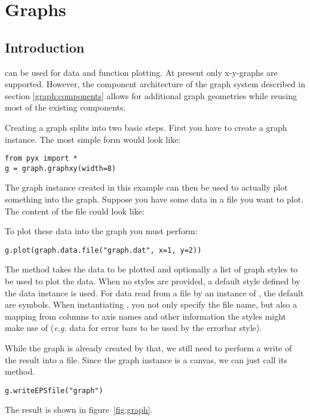 \chapter{Graphs}
\label{graph}
\let\e=\textbackslash

\section{Introduction} %
\PyX{} can be used for data and function plotting. At present only
x-y-graphs are supported. However, the component architecture of the
graph system described in section \ref{graph:components} allows for
additional graph geometries while reusing most of the existing
components.

Creating a graph splits into two basic steps. First you have to create
a graph instance. The most simple form would look like:
\begin{verbatim}
from pyx import *
g = graph.graphxy(width=8)
\end{verbatim}
The graph instance  created in this example can then be used
to actually plot something into the graph. Suppose you have some data
in a file  you want to plot. The content of the file
could look like:

To plot these data into the graph  you must perform:
\begin{verbatim}
g.plot(graph.data.file("graph.dat", x=1, y=2))
\end{verbatim}
The method  takes the data to be plotted and optionally
a list of graph styles to be used to plot the data. When no styles are
provided, a default style defined by the data instance is used. For
data read from a file by an instance of , the
default are symbols. When instantiating , you
not only specify the file name, but also a mapping from columns to
axis names and other information the styles might make use of
(\emph{e.g.} data for error bars to be used by the errorbar style).

While the graph is already created by that, we still need to perform a
write of the result into a file. Since the graph instance is a canvas,
we can just call its  method.
\begin{verbatim}
g.writeEPSfile("graph")
\end{verbatim}
The result  is shown in figure~\ref{fig:graph}.

